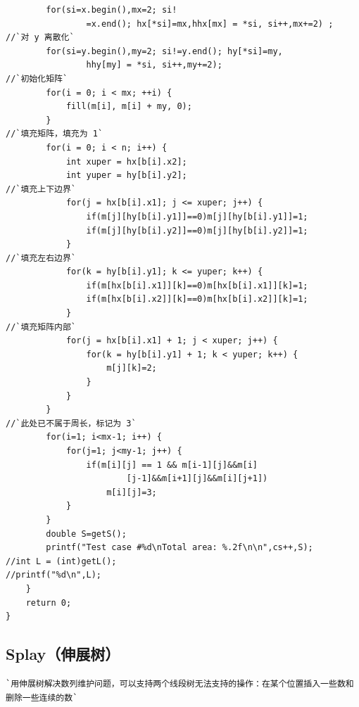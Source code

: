 \documentclass[a4paper]{article}
\begin{document}
\begin{CJK*}{UTF8}{gbsn}
\begin{multicols}{3}
\begin{flushleft}
\begin{lstlisting}
        for(si=x.begin(),mx=2; si!
                =x.end(); hx[*si]=mx,hhx[mx] = *si, si++,mx+=2) ;
//`对 y 离散化`
        for(si=y.begin(),my=2; si!=y.end(); hy[*si]=my,
                hhy[my] = *si, si++,my+=2);
//`初始化矩阵`
        for(i = 0; i < mx; ++i) {
            fill(m[i], m[i] + my, 0);
        }
//`填充矩阵，填充为 1`
        for(i = 0; i < n; i++) {
            int xuper = hx[b[i].x2];
            int yuper = hy[b[i].y2];
//`填充上下边界`
            for(j = hx[b[i].x1]; j <= xuper; j++) {
                if(m[j][hy[b[i].y1]]==0)m[j][hy[b[i].y1]]=1;
                if(m[j][hy[b[i].y2]]==0)m[j][hy[b[i].y2]]=1;
            }
//`填充左右边界`
            for(k = hy[b[i].y1]; k <= yuper; k++) {
                if(m[hx[b[i].x1]][k]==0)m[hx[b[i].x1]][k]=1;
                if(m[hx[b[i].x2]][k]==0)m[hx[b[i].x2]][k]=1;
            }
//`填充矩阵内部`
            for(j = hx[b[i].x1] + 1; j < xuper; j++) {
                for(k = hy[b[i].y1] + 1; k < yuper; k++) {
                    m[j][k]=2;
                }
            }
        }
//`此处已不属于周长，标记为 3`
        for(i=1; i<mx-1; i++) {
            for(j=1; j<my-1; j++) {
                if(m[i][j] == 1 && m[i-1][j]&&m[i]
                        [j-1]&&m[i+1][j]&&m[i][j+1])
                    m[i][j]=3;
            }
        }
        double S=getS();
        printf("Test case #%d\nTotal area: %.2f\n\n",cs++,S);
//int L = (int)getL();
//printf("%d\n",L);
    }
    return 0;
}

\end{lstlisting}

\subsection{Splay（伸展树）}
\begin{lstlisting}
`用伸展树解决数列维护问题，可以支持两个线段树无法支持的操作：在某个位置插入一些数和删除一些连续的数`
\end{lstlisting}


\end{flushleft}
\end{multicols}
\end{CJK*}
\end{document}
